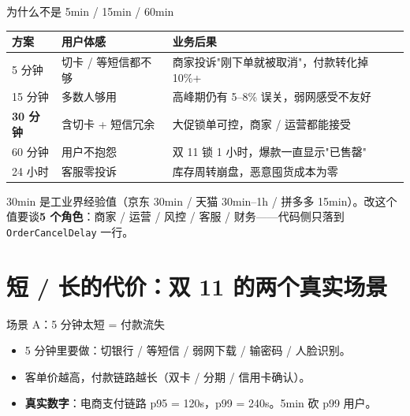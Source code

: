 \begin{frame}{为什么不是 5min / 15min / 60min}
{\small
\begin{tabular}{@{}llp{5.2cm}@{}}
\toprule
方案 & 用户体感 & 业务后果 \\
\midrule
5 分钟    & 切卡 / 等短信都不够 & 商家投诉"刚下单就被取消"，付款转化掉 10\%+ \\
15 分钟   & 多数人够用         & 高峰期仍有 5--8\% 误关，弱网感受不友好 \\
\textbf{30 分钟} & 含切卡 + 短信冗余  & 大促锁单可控，商家 / 运营都能接受 \\
60 分钟   & 用户不抱怨         & 双 11 锁 1 小时，爆款一直显示"已售罄" \\
24 小时   & 客服零投诉         & 库存周转崩盘，恶意囤货成本为零 \\
\bottomrule
\end{tabular}
}
\vspace{1mm}
\small 30min 是工业界经验值（京东 30min / 天猫 30min--1h / 拼多多 15min）。改这个值要谈\textbf{5 个角色}：商家 / 运营 / 风控 / 客服 / 财务——代码侧只落到 \texttt{OrderCancelDelay} 一行。
\end{frame}

\section{短 / 长的代价：双 11 的两个真实场景}

\begin{frame}{场景 A：5 分钟太短 = 付款流失}
\vspace{2mm}
\begin{itemize}
  \item 5 分钟里要做：切银行 / 等短信 / 弱网下载 / 输密码 / 人脸识别。
  \item 客单价越高，付款链路越长（双卡 / 分期 / 信用卡确认）。
  \item \textbf{真实数字}：电商支付链路 p95 = 120s，p99 = 240s。5min 砍 p99 用户。
\end{itemize}
\end{frame}


